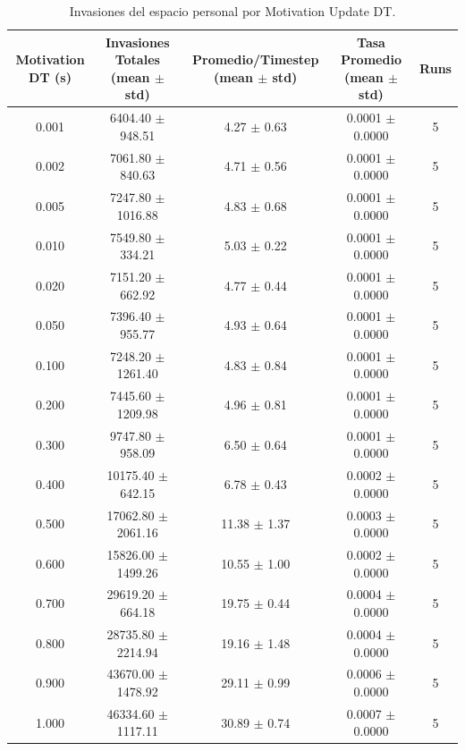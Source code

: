 \begin{table}[htbp]
\centering
\caption{Invasiones del espacio personal por Motivation Update DT.}
\label{tab:personal_space_invasion_motivation_dt}
\begin{tabular}{ccccc}
\hline
Motivation DT (s) & Invasiones Totales (mean $\pm$ std) & Promedio/Timestep (mean $\pm$ std) & Tasa Promedio (mean $\pm$ std) & Runs \\
\hline
0.001 & 6404.40 $\pm$ 948.51 & 4.27 $\pm$ 0.63 & 0.0001 $\pm$ 0.0000 & 5 \\
0.002 & 7061.80 $\pm$ 840.63 & 4.71 $\pm$ 0.56 & 0.0001 $\pm$ 0.0000 & 5 \\
0.005 & 7247.80 $\pm$ 1016.88 & 4.83 $\pm$ 0.68 & 0.0001 $\pm$ 0.0000 & 5 \\
0.010 & 7549.80 $\pm$ 334.21 & 5.03 $\pm$ 0.22 & 0.0001 $\pm$ 0.0000 & 5 \\
0.020 & 7151.20 $\pm$ 662.92 & 4.77 $\pm$ 0.44 & 0.0001 $\pm$ 0.0000 & 5 \\
0.050 & 7396.40 $\pm$ 955.77 & 4.93 $\pm$ 0.64 & 0.0001 $\pm$ 0.0000 & 5 \\
0.100 & 7248.20 $\pm$ 1261.40 & 4.83 $\pm$ 0.84 & 0.0001 $\pm$ 0.0000 & 5 \\
0.200 & 7445.60 $\pm$ 1209.98 & 4.96 $\pm$ 0.81 & 0.0001 $\pm$ 0.0000 & 5 \\
0.300 & 9747.80 $\pm$ 958.09 & 6.50 $\pm$ 0.64 & 0.0001 $\pm$ 0.0000 & 5 \\
0.400 & 10175.40 $\pm$ 642.15 & 6.78 $\pm$ 0.43 & 0.0002 $\pm$ 0.0000 & 5 \\
0.500 & 17062.80 $\pm$ 2061.16 & 11.38 $\pm$ 1.37 & 0.0003 $\pm$ 0.0000 & 5 \\
0.600 & 15826.00 $\pm$ 1499.26 & 10.55 $\pm$ 1.00 & 0.0002 $\pm$ 0.0000 & 5 \\
0.700 & 29619.20 $\pm$ 664.18 & 19.75 $\pm$ 0.44 & 0.0004 $\pm$ 0.0000 & 5 \\
0.800 & 28735.80 $\pm$ 2214.94 & 19.16 $\pm$ 1.48 & 0.0004 $\pm$ 0.0000 & 5 \\
0.900 & 43670.00 $\pm$ 1478.92 & 29.11 $\pm$ 0.99 & 0.0006 $\pm$ 0.0000 & 5 \\
1.000 & 46334.60 $\pm$ 1117.11 & 30.89 $\pm$ 0.74 & 0.0007 $\pm$ 0.0000 & 5 \\
\hline
\end{tabular}
\end{table}
